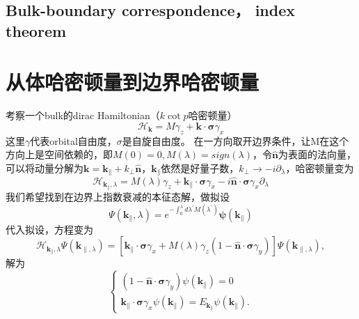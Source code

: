 \documentclass[10pt,openany]{book}
\theoremstyle{thmstyle} %
\theoremstyle{defstyle} %
\theoremstyle{prostyle} %
\begin{document}
\subsection{Bulk-boundary correspondence， index theorem} 
\section{从体哈密顿量到边界哈密顿量}
考察一个bulk的dirac Hamiltonian（$ k\cot p $哈密顿量）
\begin{equation}
  \mathcal{H}_{\boldsymbol{k}}=M \gamma_z+\boldsymbol{k} \cdot \boldsymbol{\sigma} \gamma_x
\end{equation}
这里$ \gamma $代表orbital自由度，$ \sigma $是自旋自由度。 在一方向取开边界条件，让M在这个方向上是空间依赖的，即$ M(0)=0,M(\lambda)=sign(\lambda) $，令$ \hat{\boldsymbol{n}} $为表面的法向量，可以将动量分解为$ \boldsymbol{k}=\boldsymbol{k}_{\|}+k_{\perp} \hat{\boldsymbol{n}} $，$ \boldsymbol{k}_{\|} $依然是好量子数，$ k_{\perp} \rightarrow-i \partial_\lambda $，哈密顿量变为
\begin{equation}
  \mathcal{H}_{\boldsymbol{k}_{\|}, \lambda}=M(\lambda) \gamma_z+\boldsymbol{k}_{\|} \cdot \boldsymbol{\sigma} \gamma_x-i \hat{\boldsymbol{n}} \cdot \boldsymbol{\sigma} \gamma_x \partial_\lambda
\end{equation}
我们希望找到在边界上指数衰减的本征态解，做拟设
\begin{equation*}
  \Psi\left(\boldsymbol{k}_{\|}, \lambda\right)=e^{-\int_0^\lambda d \lambda^{\prime} M\left(\lambda^{\prime}\right)} \boldsymbol{\psi}\left(\boldsymbol{k}_{\|}\right)
\end{equation*}
代入拟设，方程变为
\begin{equation}
  \mathcal{H}_{\boldsymbol{k}_{\|}, \lambda} \Psi\left(\boldsymbol{k}_{\|, \lambda}\right)=[\boldsymbol{k}_{\|} \cdot \boldsymbol{\sigma} \gamma_x+M(\lambda) \gamma_z\left(1-\hat{\boldsymbol{n}} \cdot \boldsymbol{\sigma} \gamma_y\right)] \Psi\left(\boldsymbol{k}_{\|, \lambda}\right),
\end{equation}
解为
\begin{equation*}
  \left\{\begin{array}{l}
    \left(1-\hat{\boldsymbol{n}} \cdot \boldsymbol{\sigma} \gamma_y\right) \psi\left(\boldsymbol{k}_{\|}\right)=0 \\
    \boldsymbol{k}_{\|} \cdot \boldsymbol{\sigma} \gamma_x \psi\left(\boldsymbol{k}_{\|}\right)=E_{\boldsymbol{k}_{\|}} \psi\left(\boldsymbol{k}_{\|}\right) .
    \end{array}\right.
\end{equation*}
\end{document}
